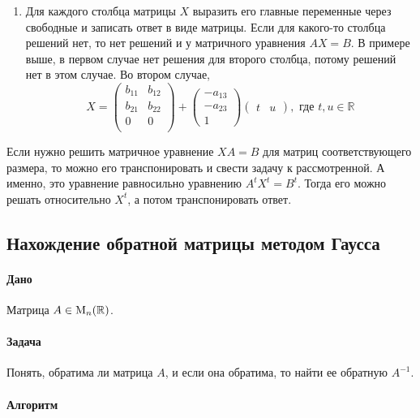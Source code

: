 \begin{enumerate}
\item Для каждого столбца матрицы $X$ выразить его главные переменные через свободные и записать ответ в виде матрицы.
Если для какого-то столбца решений  нет, то нет решений и у матричного уравнения $AX = B$.
В примере выше, в первом случае нет решения для второго столбца, потому решений нет в этом случае.
Во втором случае, 
\[
X = 
\begin{pmatrix}
{b_{11}}&{b_{12}}\\
{b_{21}}&{b_{22}}\\
{0}&{0}\\
\end{pmatrix}
+
\begin{pmatrix}
{-a_{13}}\\{-a_{23}}\\{1}
\end{pmatrix}
\begin{pmatrix}
{t}&{u}
\end{pmatrix},\text{ где } t,u\in \mathbb R
\]
\end{enumerate}

Если нужно решить матричное уравнение $XA = B$ для матриц соответствующего размера, то можно его транспонировать и свести задачу к рассмотренной.
А именно, это уравнение равносильно уравнению $A^t X^t = B^t$.
Тогда его можно решать относительно $X^t$, а потом транспонировать ответ.

\subsection{Нахождение обратной матрицы методом Гаусса}
\label{section::InverseAlgo}

\paragraph{Дано}

Матрица $A\in \operatorname{M}_{n}(\mathbb R)$.

\paragraph{Задача}

Понять, обратима ли матрица $A$, и если она обратима, то найти ее обратную $A^{-1}$.

\paragraph{Алгоритм} 

